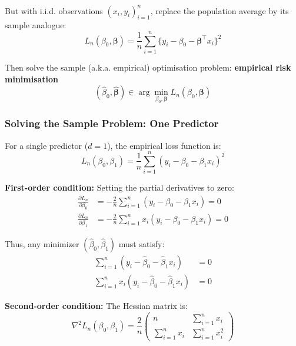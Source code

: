But with i.i.d. observations $(x_i,y_i)_{i=1}^{n}$, replace the population average by its sample analogue:
\begin{equation*}
    L_n(\beta_0,\bm\beta)=\frac{1}{n}\sum_{i=1}^{n}\{y_i-\beta_0-\bm\beta^\top x_i\}^2
\end{equation*}

Then solve the sample (a.k.a. empirical) optimisation problem: \textbf{empirical risk minimisation}
\begin{equation*}
    (\widehat{\beta}_0,\widehat{\bm\beta})\in\arg \min_{\beta_0,\bm\beta}L_n(\beta_0,\bm\beta)
\end{equation*}

\subsubsection{Solving the Sample Problem: One Predictor}

For a single predictor ($d=1$), the empirical loss function is:
\begin{equation*}
    L_n(\beta_0, \beta_1) = \frac{1}{n}\sum_{i=1}^n (y_i - \beta_0 - \beta_1 x_i)^2
\end{equation*}

\textbf{First-order condition:}
Setting the partial derivatives to zero:
\begin{align*}
    \frac{\partial L_n}{\partial \beta_0} &= -\frac{2}{n}\sum_{i=1}^n (y_i - \beta_0 - \beta_1 x_i) = 0 \\
    \frac{\partial L_n}{\partial \beta_1} &= -\frac{2}{n}\sum_{i=1}^n x_i(y_i - \beta_0 - \beta_1 x_i) = 0
\end{align*}

Thus, any minimizer $(\hat{\beta}_0, \hat{\beta}_1)$ must satisfy:
\begin{align*}
    \sum_{i=1}^n (y_i - \hat{\beta}_0 - \hat{\beta}_1 x_i) &= 0 \\
    \sum_{i=1}^n x_i(y_i - \hat{\beta}_0 - \hat{\beta}_1 x_i) &= 0
\end{align*}

\textbf{Second-order condition:} The Hessian matrix is:
\begin{equation*}
    \nabla^2 L_n(\beta_0, \beta_1) = \frac{2}{n}
    \begin{pmatrix}
        n & \sum_{i=1}^n x_i \\
        \sum_{i=1}^n x_i & \sum_{i=1}^n x_i^2
    \end{pmatrix}
\end{equation*}

